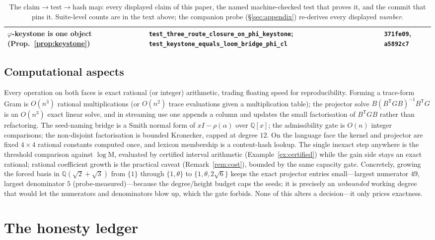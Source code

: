 \documentclass[11pt]{article}
\theoremstyle{plain}
\theoremstyle{definition}
\theoremstyle{remark}
\newcommand{\Q}{\mathbb{Q}}
\newcommand{\Mah}{\mathrm{M}}
\newcommand{\GG}{G}
\newcommand{\BB}{B}
\newcommand{\transpose}{^{\mathsf{T}}}
\newcommand{\inv}{^{-1}}
\begin{document}
\begin{table}[ht]
\begin{tabular}{p{} p{} l}
$\varphi$-keystone is one object (Prop.~\ref{prop:keystone}) & \texttt{test\_three\_route\_closure\_on\_phi\_keystone}; \texttt{test\_keystone\_equals\_loom\_bridge\_phi\_cl} & \texttt{371fe09}, \texttt{a5892c7} \\
\bottomrule
\end{tabular}
\caption{The claim$\to$test$\to$hash map: every displayed claim of this paper, the named machine-checked test
that proves it, and the commit that pins it. Suite-level counts are in the text above; the companion probe
(\S\ref{sec:appendix}) re-derives every displayed \emph{number}.}
\label{tab:claimmap}
\end{table}

\subsection{Computational aspects}\label{subsec:complexity}
Every operation on both faces is exact rational (or integer) arithmetic, trading floating speed for
reproducibility. Forming a trace-form Gram is $O(n^3)$ rational multiplications (or $O(n^2)$ trace
evaluations given a multiplication table); the projector solve $\BB(\BB\transpose\GG\BB)\inv\BB\transpose\GG$
is an $O(n^3)$ exact linear solve, and in streaming use one appends a column and updates the small
factorisation of $\BB\transpose\GG\BB$ rather than refactoring. The seed-naming bridge is a Smith normal form
of $xI-\rho(\alpha)$ over $\Q[x]$; the admissibility gate is $O(n)$ integer comparisons; the non-disjoint
factorisation is bounded Kronecker, capped at degree $12$. On the language face the kernel and projector are
fixed $4\times4$ rational constants computed once, and lexicon membership is a content-hash lookup. The single
inexact step anywhere is the threshold comparison against $\log\Mah$, evaluated by certified interval
arithmetic (Example~\ref{ex:certified}) while the gain side stays an exact rational; rational coefficient
growth is the practical caveat (Remark~\ref{rem:cost}), bounded by the same capacity gate. Concretely, growing
the forced basis in $\Q(\sqrt2+\sqrt3)$ from $\{1\}$ through $\{1,\theta\}$ to $\{1,\theta,2\sqrt6\}$ keeps the
exact projector entries small---largest numerator $49$, largest denominator $5$ (probe-measured)---because the
degree/height budget caps the seeds; it is precisely an \emph{unbounded} working degree that would let the
numerators and denominators blow up, which the gate forbids. None of this alters a decision---it only prices
exactness.

\section{The honesty ledger}\label{sec:ledger}
\end{document}
